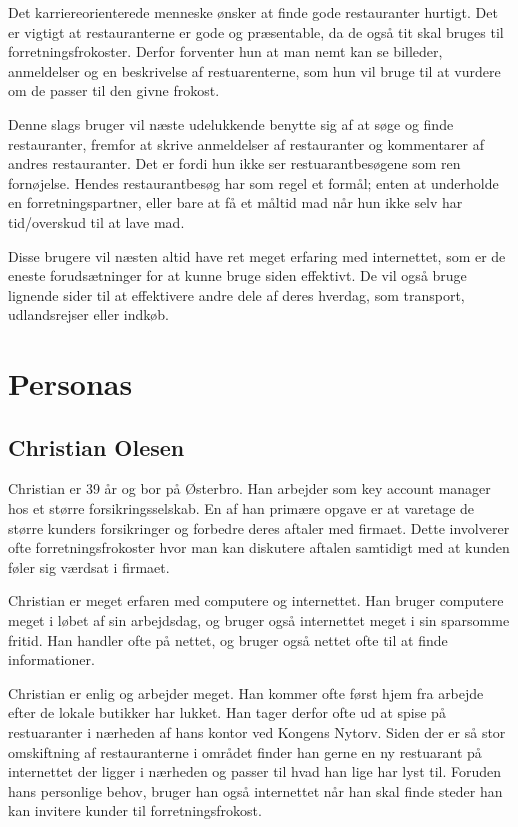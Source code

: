 \documentclass[a4paper, 12pt]{article}
\begin{document}
Det karriereorienterede menneske ønsker at finde gode restauranter hurtigt. Det
er vigtigt at restauranterne er gode og præsentable, da de også tit skal bruges
til forretningsfrokoster. Derfor forventer hun at man nemt kan se billeder,
anmeldelser og en beskrivelse af restuarenterne, som hun vil bruge til at
vurdere om de passer til den givne frokost. 

Denne slags bruger vil næste udelukkende benytte sig af at søge og finde
restauranter, fremfor at skrive anmeldelser af restauranter og kommentarer af
andres restauranter. Det er fordi hun ikke ser restuarantbesøgene som ren
fornøjelse. Hendes restaurantbesøg har som regel et formål; enten at underholde
en forretningspartner, eller bare at få et måltid mad når hun ikke selv har
tid/overskud til at lave mad. 

Disse brugere vil næsten altid have ret meget erfaring med internettet, som er
de eneste forudsætninger for at kunne bruge siden effektivt. De vil også bruge
lignende sider til at effektivere andre dele af deres hverdag, som transport,
udlandsrejser eller indkøb.

\section{Personas}
\label{sec:Personas}

\subsection{Christian Olesen}
Christian er 39 år og bor på Østerbro. Han arbejder som key account manager hos
et større forsikringsselskab. En af han primære opgave er at varetage de større
kunders forsikringer og forbedre deres aftaler med firmaet. Dette involverer
ofte forretningsfrokoster hvor man kan diskutere aftalen samtidigt med at kunden
føler sig værdsat i firmaet.

Christian er meget erfaren med computere og internettet. Han bruger computere
meget i løbet af sin arbejdsdag, og bruger også internettet meget i sin
sparsomme fritid. Han handler ofte på nettet, og bruger også nettet ofte til at
finde informationer. 

Christian er enlig og arbejder meget. Han kommer ofte først hjem fra arbejde
efter de lokale butikker har lukket. Han tager derfor ofte ud at spise på
restuaranter i nærheden af hans kontor ved Kongens Nytorv. Siden der er så stor
omskiftning af restauranterne i området finder han gerne en ny restuarant på
internettet der ligger i nærheden og passer til hvad han lige har lyst til.
Foruden hans personlige behov, bruger han også internettet når han skal finde
steder han kan invitere kunder til forretningsfrokost. 
\end{document}
